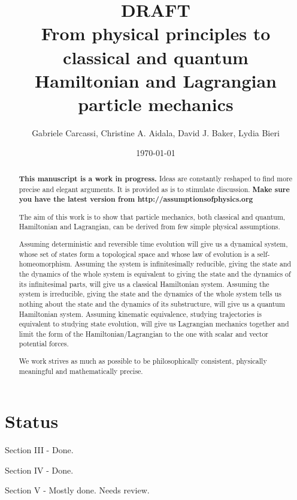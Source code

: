 \documentclass[aps,pra,10pt,twocolumn,floatfix,nofootinbib]{revtex4-1}
\numberwithin{equation}{section}
\theoremstyle{definition}
\begin{document}
\title{DRAFT \\ From physical principles to classical and quantum \\ Hamiltonian and Lagrangian particle mechanics}
\author{Gabriele Carcassi, Christine A. Aidala, David J. Baker, Lydia Bieri}
\date{\today}

\begin{abstract}
\textbf{This manuscript is a work in progress.} Ideas are constantly reshaped to find more precise and elegant arguments. It is provided as is to stimulate discussion.  \textbf{Make sure you have the latest version from http://assumptionsofphysics.org}

The aim of this work is to show that particle mechanics, both classical and quantum, Hamiltonian and Lagrangian, can be derived from few simple physical assumptions.

Assuming deterministic and reversible time evolution will give us a dynamical system, whose set of states form a topological space and whose law of evolution is a self-homeomorphism. Assuming the system is infinitesimally reducible, giving the state and the dynamics of the whole system is equivalent to giving the state and the dynamics of its infinitesimal parts, will give us a classical Hamiltonian system. Assuming the system is irreducible, giving the state and the dynamics of the whole system tells us nothing about the state and the dynamics of its substructure, will give us a quantum Hamiltonian system. Assuming kinematic equivalence, studying trajectories is equivalent to studying state evolution, will give us Lagrangian mechanics together and limit the form of the Hamiltonian/Lagrangian to the one with scalar and vector potential forces.

We work strives as much as possible to be philosophically consistent, physically meaningful and mathematically precise.
\end{abstract}
\maketitle

\section{Status}

Section III - Done.

Section IV - Done.

Section V - Mostly done. Needs review.
\end{document}
